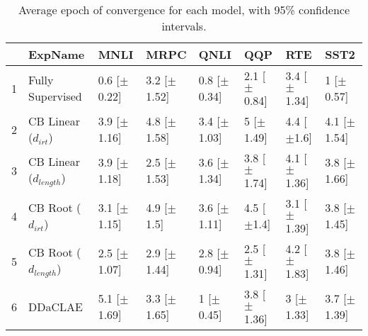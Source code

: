 \begin{table}[ht]
\centering
\begin{tabular}{rlllllll}
  \hline
 & ExpName & MNLI & MRPC & QNLI & QQP & RTE & SST2 \\ 
  \hline
1 & Fully Supervised & 0.6 [$\pm$0.22] & 3.2 [$\pm$1.52] & 0.8 [$\pm$0.34] & 2.1 [$\pm$0.84] & 3.4 [$\pm$1.34] & 1 [$\pm$0.57] \\ 
  2 & CB Linear ($d_{irt}$) & 3.9 [$\pm$1.16] & 4.8 [$\pm$1.58] & 3.4 [$\pm$1.03] & 5 [$\pm$1.49] & 4.4 [$\pm$1.6] & 4.1 [$\pm$1.54] \\ 
  3 & CB Linear ($d_{length}$) & 3.9 [$\pm$1.18] & 2.5 [$\pm$1.53] & 3.6 [$\pm$1.34] & 3.8 [$\pm$1.74] & 4.1 [$\pm$1.36] & 3.8 [$\pm$1.66] \\ 
  4 & CB Root ($d_{irt}$) & 3.1 [$\pm$1.15] & 4.9 [$\pm$1.5] & 3.6 [$\pm$1.11] & 4.5 [$\pm$1.4] & 3.1 [$\pm$1.39] & 3.8 [$\pm$1.45] \\ 
  5 & CB Root ($d_{length}$) & 2.5 [$\pm$1.07] & 2.9 [$\pm$1.44] & 2.8 [$\pm$0.94] & 2.5 [$\pm$1.31] & 4.2 [$\pm$1.83] & 3.8 [$\pm$1.46] \\ 
  6 & DDaCLAE & 5.1 [$\pm$1.69] & 3.3 [$\pm$1.65] & 1 [$\pm$0.45] & 3.8 [$\pm$1.36] & 3 [$\pm$1.33] & 3.7 [$\pm$1.39] \\ 
   \hline
\end{tabular}
\caption{Average epoch of convergence for each model, with 95\% confidence intervals.} 
\end{table}
